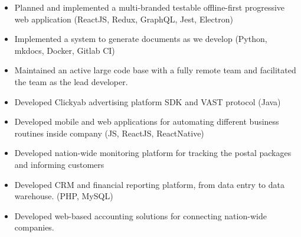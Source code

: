 \documentclass[10pt,a4paper,ragged2e]{altacv}
\begin{document}
\divider

\begin{itemize}
\item Planned and implemented a multi-branded testable offline-first progressive web application (ReactJS, Redux, GraphQL, Jest, Electron)
\item Implemented a system to generate documents as we develop (Python, mkdocs, Docker, Gitlab CI)
\item Maintained an active large code base with a fully remote team and facilitated the team as the lead developer.
\end{itemize}

\divider




\begin{itemize}
\item Developed Clickyab advertising platform SDK and VAST protocol (Java)
\end{itemize}

\divider

\begin{itemize}
\item Developed mobile and web applications for automating different business
  routines inside company (JS, ReactJS, ReactNative)
\item Developed nation-wide monitoring platform for tracking the postal packages and informing customers
\end{itemize}
 
 \divider

\begin{itemize}
\item Developed CRM and financial reporting platform, from data entry
  to data warehouse. (PHP, MySQL)
\item Developed web-based accounting solutions for connecting nation-wide companies.
\end{itemize} 
\end{document}
